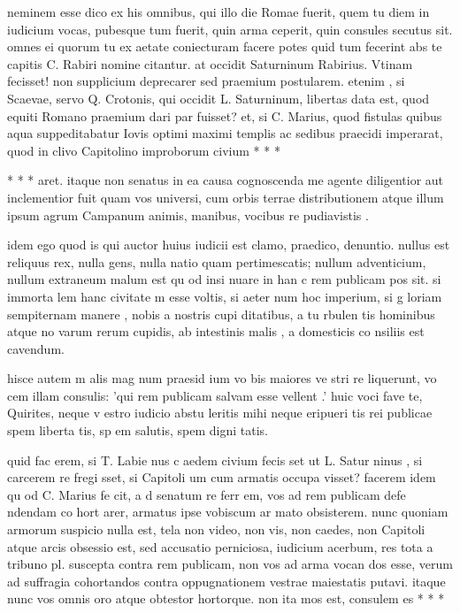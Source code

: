  neminem esse dico ex his omnibus, qui illo die Romae fuerit, quem tu diem in iudicium vocas, pubesque tum fuerit, quin arma ceperit, quin consules secutus sit. omnes ei quorum tu ex aetate coniecturam facere potes quid tum fecerint abs te capitis C. Rabiri nomine citantur. at occidit Saturninum Rabirius. Vtinam fecisset! non supplicium deprecarer sed praemium postularem. etenim , si Scaevae, servo Q. Crotonis, qui occidit L. Saturninum, libertas data est, quod equiti Romano praemium dari par fuisset? et, si C. Marius, quod fistulas quibus aqua suppeditabatur Iovis optimi maximi templis ac sedibus praecidi imperarat, quod in clivo Capitolino improborum civium * * *

 * * * aret. itaque non senatus in ea causa cognoscenda me agente diligentior aut inclementior fuit quam vos universi, cum orbis terrae distributionem atque illum ipsum agrum Campanum animis, manibus, vocibus re pudiavistis .

 idem ego quod is qui auctor huius iudicii est clamo, praedico, denuntio. nullus est reliquus rex, nulla gens, nulla natio quam pertimescatis; nullum adventicium, nullum extraneum malum est qu od insi nuare in han c rem publicam pos sit. si immorta lem hanc civitate m esse voltis, si aeter num hoc imperium, si g loriam sempiternam manere , nobis a nostris cupi ditatibus, a tu rbulen tis hominibus atque no varum rerum cupidis, ab intestinis malis , a domesticis co nsiliis est cavendum.

 hisce autem m alis mag num praesid ium vo bis maiores ve stri re liquerunt, vo cem illam consulis: 'qui rem publicam salvam esse vellent .' huic voci fave te, Quirites, neque v estro iudicio abstu leritis mihi neque eripueri tis rei publicae spem liberta tis, sp em salutis, spem digni tatis.

 quid fac erem, si T. Labie nus c aedem civium fecis set ut L. Satur ninus , si carcerem re fregi sset, si Capitoli um cum armatis occupa visset? facerem idem qu od C. Marius fe cit, a d senatum re ferr em, vos ad rem publicam defe ndendam co hort arer, armatus ipse vobiscum ar mato obsisterem. nunc quoniam armorum suspicio nulla est, tela non video, non vis, non caedes, non Capitoli atque arcis obsessio est, sed accusatio perniciosa, iudicium acerbum, res tota a tribuno pl. suscepta contra rem publicam, non vos ad arma vocan dos esse, verum ad suffragia cohortandos contra oppugnationem vestrae maiestatis putavi. itaque nunc vos omnis oro atque obtestor hortorque. non ita mos est, consulem es * * *

